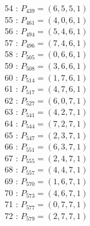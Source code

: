 \documentclass{article}
\begin{document}
{\begin{multicols}{3}
54 : $P_{439}=( 6, 5, 5, 1 )$\\
55 : $P_{461}=( 4, 0, 6, 1 )$\\
56 : $P_{494}=( 5, 4, 6, 1 )$\\
57 : $P_{496}=( 7, 4, 6, 1 )$\\
58 : $P_{505}=( 0, 6, 6, 1 )$\\
59 : $P_{508}=( 3, 6, 6, 1 )$\\
60 : $P_{514}=( 1, 7, 6, 1 )$\\
61 : $P_{517}=( 4, 7, 6, 1 )$\\
62 : $P_{527}=( 6, 0, 7, 1 )$\\
63 : $P_{541}=( 4, 2, 7, 1 )$\\
64 : $P_{544}=( 7, 2, 7, 1 )$\\
65 : $P_{547}=( 2, 3, 7, 1 )$\\
66 : $P_{551}=( 6, 3, 7, 1 )$\\
67 : $P_{555}=( 2, 4, 7, 1 )$\\
68 : $P_{557}=( 4, 4, 7, 1 )$\\
69 : $P_{570}=( 1, 6, 7, 1 )$\\
70 : $P_{573}=( 4, 6, 7, 1 )$\\
71 : $P_{577}=( 0, 7, 7, 1 )$\\
72 : $P_{579}=( 2, 7, 7, 1 )$\\
\end{multicols}


%


%


}%
\end{document}
